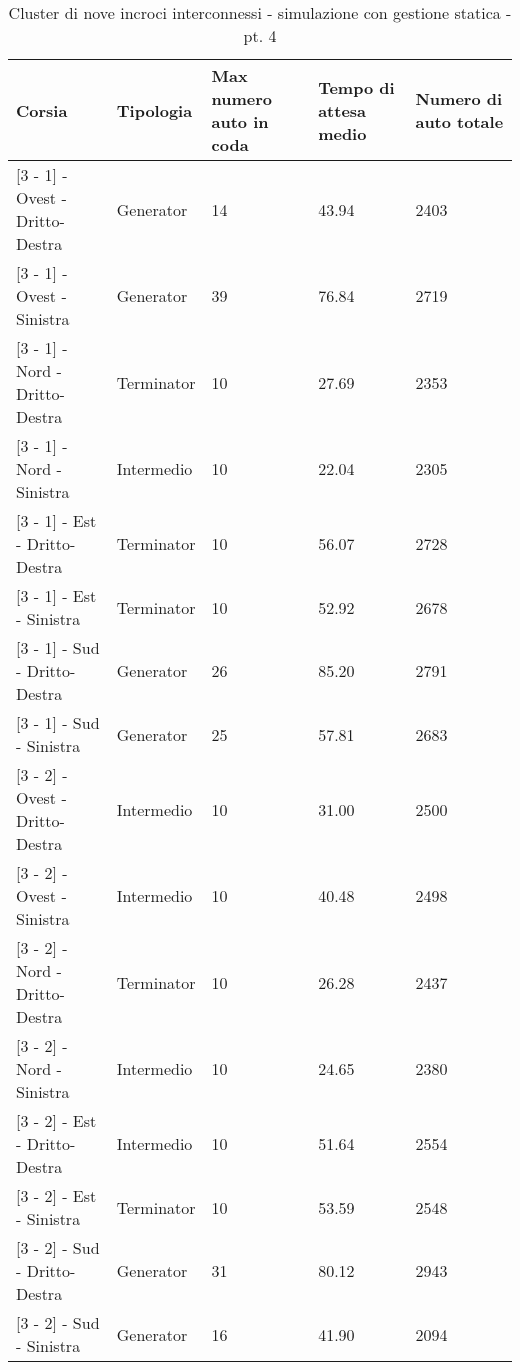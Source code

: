 \begin{table}[H]
\centering
\begin{tabular}{|C{2cm}|C{2cm}|C{3cm}|C{3cm}|C{3cm}|}
\hline
\textbf{Corsia} &
\textbf{Tipologia} &
\textbf{Max numero auto in coda} &
\textbf{Tempo di attesa medio} &
\textbf{Numero di auto totale} \\\hline
\scriptsize{[3 - 1] - Ovest - Dritto-Destra} &
Generator &
14 &
43.94 &
2403 \\\hline
\scriptsize{[3 - 1] - Ovest - Sinistra} &
Generator &
39 &
76.84 &
2719 \\\hline
\scriptsize{[3 - 1] - Nord - Dritto-Destra} &
Terminator &
10 &
27.69 &
2353 \\\hline
\scriptsize{[3 - 1] - Nord - Sinistra} &
Intermedio &
10 &
22.04 &
2305 \\\hline
\scriptsize{[3 - 1] - Est - Dritto-Destra} &
Terminator &
10 &
56.07 &
2728 \\\hline
\scriptsize{[3 - 1] - Est - Sinistra} &
Terminator &
10 &
52.92 &
2678 \\\hline
\scriptsize{[3 - 1] - Sud - Dritto-Destra} &
Generator &
26 &
85.20 &
2791 \\\hline
\scriptsize{[3 - 1] - Sud - Sinistra} &
Generator &
25 &
57.81 &
2683 \\\hline
\scriptsize{[3 - 2] - Ovest - Dritto-Destra} &
Intermedio &
10 &
31.00 &
2500 \\\hline
\scriptsize{[3 - 2] - Ovest - Sinistra} &
Intermedio &
10 &
40.48 &
2498 \\\hline
\scriptsize{[3 - 2] - Nord - Dritto-Destra} &
Terminator &
10 &
26.28 &
2437 \\\hline
\scriptsize{[3 - 2] - Nord - Sinistra} &
Intermedio &
10 &
24.65 &
2380 \\\hline
\scriptsize{[3 - 2] - Est - Dritto-Destra} &
Intermedio &
10 &
51.64 &
2554 \\\hline
\scriptsize{[3 - 2] - Est - Sinistra} &
Terminator &
10 &
53.59 &
2548 \\\hline
\scriptsize{[3 - 2] - Sud - Dritto-Destra} &
Generator &
31 &
80.12 &
2943 \\\hline
\scriptsize{[3 - 2] - Sud - Sinistra} &
Generator &
16 &
41.90 &
2094 \\\hline
\end{tabular}
\caption{Cluster di nove incroci interconnessi - simulazione con gestione statica - pt. 4}
\label{table:keytable}
\end{table}
\newpage
